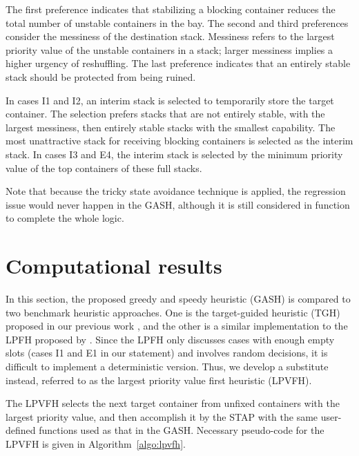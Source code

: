 \documentclass[review,3p,times,12pt,number]{elsarticle}\usepackage{amsmath}\usepackage{amssymb}
\begin{document}
The first preference indicates that stabilizing a blocking container reduces the total number of unstable containers in the bay. The second and third preferences consider the messiness of the destination stack. Messiness refers to the largest priority value of the unstable containers in a stack; larger messiness implies a higher urgency of reshuffling. The last preference indicates that an entirely stable stack should be protected from being ruined.

In cases I1 and I2, an interim stack is selected to temporarily store the target container.
The selection prefers stacks that are not entirely stable, with the largest messiness, then entirely stable stacks with the smallest capability. The most unattractive stack for receiving blocking containers is selected as the interim stack. In cases I3 and E4, the interim stack is selected by the minimum priority value of the top containers of these full stacks.

Note that because the tricky state avoidance technique is applied, the regression issue would never happen in the GASH, although it is still considered in function  to complete the whole logic.

\section{Computational results}
\label{sec:experiment}

In this section, the proposed greedy and speedy heuristic (GASH) is compared to two benchmark heuristic approaches. One is the target-guided heuristic (TGH) proposed in our previous work \citep{wang2015}, and the other is a similar implementation to the LPFH proposed by \cite{exp2012}. Since the LPFH only discusses cases with enough empty slots (cases I1 and E1 in our statement) and involves random decisions, it is difficult to implement a deterministic version. Thus, we develop a substitute instead, referred to as the largest priority value first heuristic (LPVFH).

The LPVFH selects the next target container from unfixed containers with the largest priority value, and then accomplish it by the STAP with the same user-defined functions used as that in the GASH\@. Necessary pseudo-code for the LPVFH is given in Algorithm~\ref{algo:lpvfh}.
\end{document}

